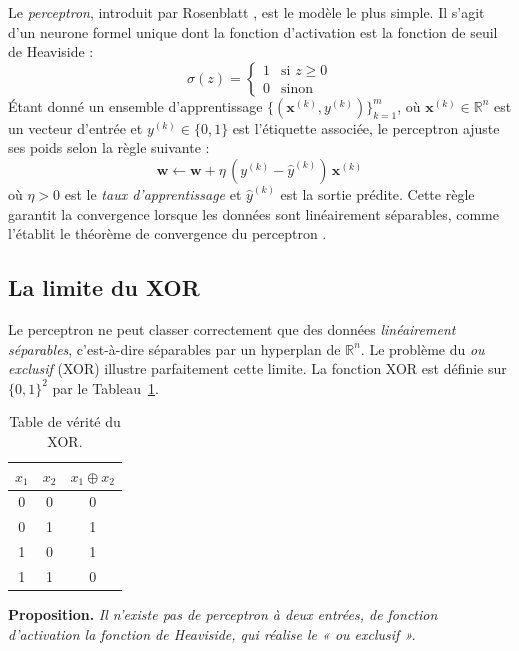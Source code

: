 \documentclass[a4paper,french]{style-LaTeX}
\begin{document}
Le \emph{perceptron}, introduit par Rosenblatt \cite{Rosenblatt58}, est le modèle le plus simple. Il s'agit d'un neurone formel unique dont la fonction d'activation est la fonction de seuil de Heaviside :
\begin{equation*}
    \sigma(z) = \begin{cases} 1 & \text{si } z \geq 0 \\ 0 & \text{sinon} \end{cases}
\end{equation*}
Étant donné un ensemble d'apprentissage $\{(\mathbf{x}^{(k)}, y^{(k)})\}_{k=1}^{m}$, où $\mathbf{x}^{(k)} \in \mathbb{R}^n$ est un vecteur d'entrée et $y^{(k)} \in \{0,1\}$ est l'étiquette associée, le perceptron ajuste ses poids selon la règle suivante :
\begin{equation*}
    \mathbf{w} \leftarrow \mathbf{w} + \eta\,(y^{(k)} - \hat{y}^{(k)})\,\mathbf{x}^{(k)}
\end{equation*}
où $\eta > 0$ est le \emph{taux d'apprentissage} et $\hat{y}^{(k)}$ est la sortie prédite. Cette règle garantit la convergence lorsque les données sont linéairement séparables, comme l'établit le théorème de convergence du perceptron \cite{Rosenblatt58}.

\subsection*{La limite du XOR}

Le perceptron ne peut classer correctement que des données \emph{linéairement séparables}, c'est-à-dire séparables par un hyperplan de $\mathbb{R}^n$. Le problème du \emph{ou exclusif} (XOR) illustre parfaitement cette limite. La fonction XOR est définie sur $\{0,1\}^2$ par le Tableau~\ref{tab:xor}.
\begin{table}[h]
    \centering
    \caption{Table de vérité du XOR.}
    \label{tab:xor}
    \begin{tabular}{cc|c}
        $x_1$ & $x_2$ & $x_1 \oplus x_2$ \\
        \hline
        0 & 0 & 0 \\
        0 & 1 & 1 \\
        1 & 0 & 1 \\
        1 & 1 & 0 \\
    \end{tabular}
\end{table}

\textbf{Proposition.} \textit{Il n'existe pas de perceptron à deux entrées, de fonction d'activation la fonction de Heaviside, qui réalise le « ou exclusif ».}
\end{document}
